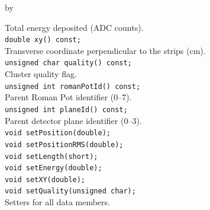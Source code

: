 \documentclass[twoside]{article}
\newcommand{\entrylabel}[1]{\mbox{\textbf{{#1}}}\hfil}%
\newenvironment{entry}
{\begin{list}{}%
    {\renewcommand{\makelabel}{\entrylabel}%
     \setlength{\labelwidth}{90pt}%
     \setlength{\leftmargin}{\labelwidth}
     \advance\leftmargin by \labelsep%
      }%
    }%
  {\end{list}}
\newcommand{\Entrylabel}[1]%
{\raisebox{0pt}[1ex][0pt]{\makebox[\labelwidth][l]%
    {\parbox[t]{\labelwidth}{\hspace{0pt}\textbf{{#1}}}}}}
\newenvironment{Entry}%
{\renewcommand{\entrylabel}{\Entrylabel}\begin{entry}}%
  {\end{entry}}
\begin{document}
\begin{Entry}
    Total energy deposited (ADC counts).\\
    \verb+double xy() const;+\\
    Transverse coordinate perpendicular to the strips (cm).\\
    \verb+unsigned char quality() const;+\\
    Cluster quality flag.\\
    \verb+unsigned int romanPotId() const;+\\
    Parent Roman Pot identifier (0--7).\\
    \verb+unsigned int planeId() const;+\\
    Parent detector plane identifier (0--3).\\
    \verb+void setPosition(double);+\\
    \verb+void setPositionRMS(double);+\\
    \verb+void setLength(short);+\\
    \verb+void setEnergy(double);+\\
    \verb+void setXY(double);+\\
    \verb+void setQuality(unsigned char);+\\
    Setters for all data members.\\
\end{Entry}
\clearpage

\end{document}
